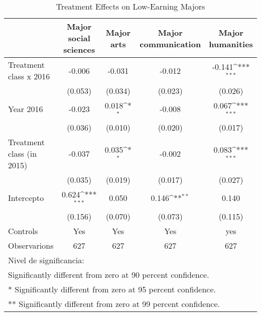 \begin{table}[]
\caption{Treatment Effects on Low-Earning Majors}
{
\def\sym#1{\ifmmode^{#1}\else\(^{#1}\)\fi}
\begin{tabular}{@{\extracolsep{2pt}}l*{4}{c}@{}}
\hline\hline


 & Major social sciences & Major arts & Major communication & Major humanities \\
\hline
Treatment class x 2016 & -0.006 & -0.031 & -0.012 & -0.141\sym{***} \\
 & (0.053) & (0.034) & (0.023) & (0.026) \\
Year 2016 & -0.023 & 0.018\sym{*} & -0.008 & 0.067\sym{***} \\
 & (0.036) & (0.010) & (0.020) & (0.017) \\
Treatment class (in 2015) & -0.037 & 0.035\sym{*} & -0.002 & 0.083\sym{***} \\
 & (0.035) & (0.019) & (0.017) & (0.027) \\
Intercepto & 0.624\sym{***} & 0.050 & 0.146\sym{**} & 0.140 \\
 & (0.156) & (0.070) & (0.073) & (0.115) \\
Controls & Yes & Yes & Yes & yes \\

\hline
Observarions & 627 & 627 & 627 & 627 \\
\hline\hline
\multicolumn{5}{l}{\footnotesize Nivel de significancia:}\vspace{-.25em} \\
\multicolumn{5}{l}{\footnotesize * Significantly different from zero at 90 percent confidence.}\vspace{-.25em} \\
\multicolumn{5}{l}{\footnotesize ** Significantly different from zero at 95 percent confidence.}\vspace{-.25em} \\
\multicolumn{5}{l}{\footnotesize *** Significantly different from zero at 99 percent confidence.}
\end{tabular}
}
\end{table}